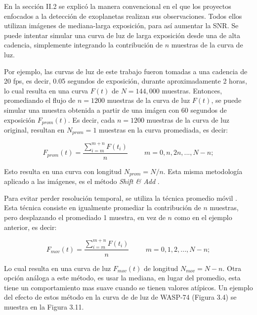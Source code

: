 En la sección II.2 se explicó la manera convencional en el que los proyectos enfocados a la detección de exoplanetas realizan sus observaciones. Todos ellos utilizan imágenes de mediana-larga exposición, para así aumentar la SNR. Se puede intentar simular una curva de luz de larga exposición desde una de alta cadencia, simplemente integrando la contribución de $n$ muestras de la curva de luz. 

Por ejemplo, las curvas de luz de este trabajo fueron tomadas a una cadencia de 20 fps, es decir, 0.05 segundos de exposición, durante aproximadamente 2 horas, lo cual resulta en una curva $F(t)$ de $N=144,000$ muestras. Entonces, promediando el flujo de $n=1200$ muestras de la curva de luz $F(t)$, se puede simular una muestra obtenida a partir de una imágen con 60 segundos de exposición $F_{prom}(t)$. Es decir, cada $n=1200$ muestras de la curva de luz original, resultan en $N_{prom}=1$ muestras en la curva promediada, es decir:

\begin{equation}
  \displaystyle F_{prom}(t)=  \dfrac{\sum\limits_{i=m}^{m+n} F(t_{i})}{n}\hspace{1cm}m=0,n,2n,...,N-n;
\end{equation}

Esto resulta en una curva con longitud $N_{prom}=N/n$. Esta misma metodología aplicado a las imágenes, es el método \textit{Shift \& Add} \cite{kluckers1996comparison}.

Para evitar perder resolución temporal, se utiliza la técnica promedio móvil \cite{borucki2009kepler}. Esta técnica consiste en igualmente promediar la contribución de $n$ muestras, pero desplazando el promediado 1 muestra, en vez de $n$ como en el ejemplo anterior, es decir:

\begin{equation}
  \displaystyle  F_{mov}(t)=  \dfrac{\sum\limits_{i=m}^{m+n} F(t_{i})}{n}\hspace{1cm}m=0,1,2,...,N-n;
\end{equation}

Lo cual resulta en una curva de luz $F_{mov}(t)$ de longitud  $N_{mov}=N-n$. Otra opción análoga a este método, es usar la mediana, en lugar del promedio, esta tiene un comportamiento mas suave cuando se tienen valores atípicos. Un ejemplo del efecto de estos método en la curva de de luz de WASP-74 (Figura 3.4) se muestra en la Figura 3.11.

